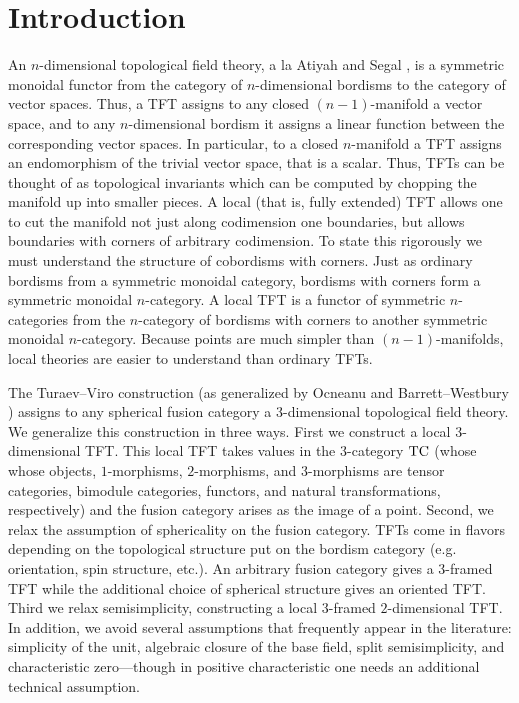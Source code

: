 \documentclass{amsart}
\begin{document}
\section{Introduction}
An $n$-dimensional topological field theory, a la Atiyah and Segal \cite{MR1001453,Segal}, is a symmetric monoidal functor from the category of $n$-dimensional bordisms to the category of vector spaces.  Thus, a TFT assigns to any closed $(n-1)$-manifold a vector space, and to any $n$-dimensional bordism it assigns a linear function between the corresponding vector spaces.  In particular, to a closed $n$-manifold a TFT assigns an endomorphism of the trivial vector space, that is a scalar.  Thus, TFTs can be thought of as topological invariants which can be computed by chopping the manifold up into smaller pieces.  A local (that is, fully extended) TFT allows one to cut the manifold not just along codimension one boundaries, but allows boundaries with corners of arbitrary codimension.  To state this rigorously we must understand the structure of cobordisms with corners.  Just as ordinary bordisms from a symmetric monoidal category, bordisms with corners  form a symmetric monoidal $n$-category.  A local TFT is a functor of symmetric $n$-categories from the $n$-category of bordisms with corners to another symmetric monoidal $n$-category.  Because points are much simpler than $(n-1)$-manifolds, local theories are easier to understand than ordinary TFTs.

The Turaev--Viro \cite{MR1191386, MR1292673} construction (as generalized by Ocneanu \cite{MR1317353} and Barrett--Westbury \cite{MR1686423}) assigns to any spherical fusion category a 3-dimensional topological field theory.  We generalize this construction in three ways.  First we construct a local $3$-dimensional TFT.  This local TFT takes values in the $3$-category $\mathrm{TC}$ (whose whose objects, $1$-morphisms, $2$-morphisms, and $3$-morphisms are tensor categories, bimodule categories, functors, and natural transformations, respectively) and the fusion category arises as the image of a point.  Second, we relax the assumption of sphericality on the fusion category.  TFTs come in flavors depending on the topological structure put on the bordism category (e.g. orientation, spin structure, etc.).  An arbitrary fusion category gives a $3$-framed TFT while the additional choice of spherical structure gives an oriented TFT.  Third we relax semisimplicity, constructing a local $3$-framed $2$-dimensional TFT.  In addition, we avoid several assumptions that frequently appear in the literature: simplicity of the unit, algebraic closure of the base field, split semisimplicity, and characteristic zero---though in positive characteristic one needs an additional technical assumption.
\end{document}

